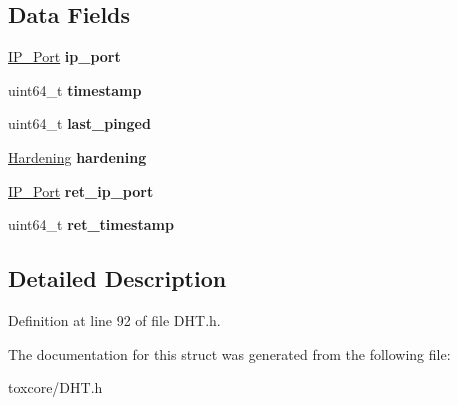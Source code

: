 \subsection*{Data Fields}
\begin{DoxyCompactItemize}
\item 
\hypertarget{struct_i_p_p_ts_png_a86e2a5a56c0dd22df6e8b8a10e40f9e4}{\hyperlink{struct_i_p___port}{I\+P\+\_\+\+Port} {\bfseries ip\+\_\+port}}\label{struct_i_p_p_ts_png_a86e2a5a56c0dd22df6e8b8a10e40f9e4}

\item 
\hypertarget{struct_i_p_p_ts_png_a465bef81f6478756e5443025b1f2ddfa}{uint64\+\_\+t {\bfseries timestamp}}\label{struct_i_p_p_ts_png_a465bef81f6478756e5443025b1f2ddfa}

\item 
\hypertarget{struct_i_p_p_ts_png_a4049204f6c392628d31be6c39f03e031}{uint64\+\_\+t {\bfseries last\+\_\+pinged}}\label{struct_i_p_p_ts_png_a4049204f6c392628d31be6c39f03e031}

\item 
\hypertarget{struct_i_p_p_ts_png_a247a5bc6669d45b7241b58223ce8fd1d}{\hyperlink{struct_hardening}{Hardening} {\bfseries hardening}}\label{struct_i_p_p_ts_png_a247a5bc6669d45b7241b58223ce8fd1d}

\item 
\hypertarget{struct_i_p_p_ts_png_a28f2dcc657352ee4855d05ed42e4a4af}{\hyperlink{struct_i_p___port}{I\+P\+\_\+\+Port} {\bfseries ret\+\_\+ip\+\_\+port}}\label{struct_i_p_p_ts_png_a28f2dcc657352ee4855d05ed42e4a4af}

\item 
\hypertarget{struct_i_p_p_ts_png_a5a40b83400feebb632862f593ad5e4a7}{uint64\+\_\+t {\bfseries ret\+\_\+timestamp}}\label{struct_i_p_p_ts_png_a5a40b83400feebb632862f593ad5e4a7}

\end{DoxyCompactItemize}


\subsection{Detailed Description}


Definition at line 92 of file D\+H\+T.\+h.



The documentation for this struct was generated from the following file\+:\begin{DoxyCompactItemize}
\item 
toxcore/D\+H\+T.\+h\end{DoxyCompactItemize}
